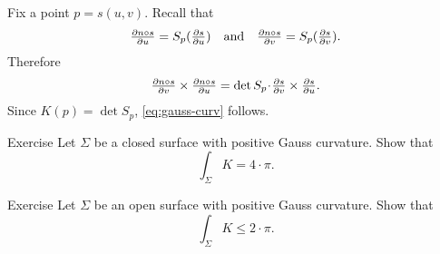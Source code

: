 Fix a point $p=s(u,v)$.
Recall that 
\[\tfrac{\partial n\circ s}{\partial u}=S_p(\tfrac{\partial  s}{\partial u})\quad\text{and}\quad\tfrac{\partial n\circ s}{\partial v}=S_p(\tfrac{\partial  s}{\partial v}).\]
Therefore 
\[\tfrac{\partial \Norm\circ s}{\partial v}\times\tfrac{\partial \Norm\circ s}{\partial u}=\det S_p\cdot \tfrac{\partial s}{\partial v}\times\tfrac{\partial s}{\partial u}.\]
Since $K(p)=\det S_p$, \ref{eq:gauss-curv} follows.
\qeds

\begin{thm}{Exercise}\label{ex:int-gauss=4pi}
Let $\Sigma$ be a closed surface with positive Gauss curvature.
Show that 
\[\int_\Sigma K=4\cdot\pi.\]

\end{thm}

\begin{thm}{Exercise}\label{ex:gauss-integral-open}
Let $\Sigma$ be an open surface with positive Gauss curvature.
Show that 
\[\int_\Sigma K\le 2\cdot\pi.\]

\end{thm}
